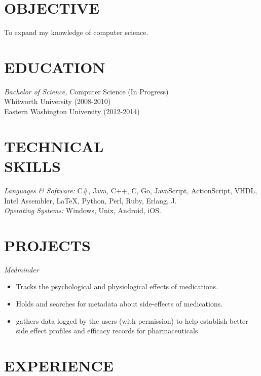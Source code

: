 \documentclass[line,margin]{res}
\begin{document}
\address{905 Elm St., LA Hall, Room 142, Cheney, WA, 99004}
\address{509-699-1184}
\address{ericfode@gmail.com}

 
\begin{resume}
 
\section{OBJECTIVE}       
				To expand my knowledge of computer science.
 
 
\section{EDUCATION} {\sl Bachelor of Science,} Computer Science (In Progress)\\
					Whitworth University (2008-2010) \\
					Eastern Washington University (2012-2014)
 
 
\section{TECHNICAL \\ SKILLS} {\sl Languages \& Software:} C\#, Java, C++, C, Go,  JavaScript, ActionScript, VHDL, Intel Assembler, \LaTeX, Python, Perl, Ruby, Erlang, J.\\
                {\sl Operating Systems:} Windows, Unix, Android, iOS.
                
\section{PROJECTS} {\sl Medminder}
                 \begin{itemize}  \itemsep -2pt %
                	\item Tracks the psychological and physiological effects of medications.
                	\item Holds and searches for metadata about side-effects of medications.
                	\item gathers data logged by the users (with permission) to help establish better side effect profiles and efficacy records for pharmaceuticals.
                \end{itemize}
\section{EXPERIENCE} 


\end{resume}
\end{document}

